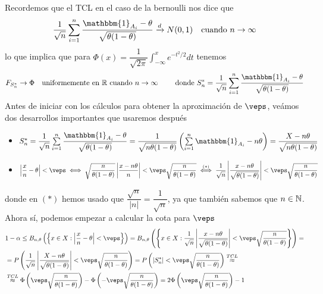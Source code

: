 \noindent
{} Recordemos que el TCL en el caso de la bernoulli nos dice que
\begin{equation*}
    \dfrac{1}{\sqrt{n}} \sum\limits_{i=1}^{n} \dfrac{\mathbbm{1}_{A_i} - \theta}{\sqrt{\theta(1-\theta)}} \xrightarrow{d} N(0,1) \quad \text{cuando } n \to \infty
\end{equation*}
lo que implica que para $\Phi(x)=\dfrac{1}{\sqrt{2\pi}} \int_{-\infty}^{x} e^{-t^2/2} dt$ tenemos
\begin{equation*}
    F_{S_n^*}\to \Phi \quad \text{uniformemente en } \R \text{ cuando }n \to \infty \qquad \text{ donde } S_n^* = \dfrac{1}{\sqrt{n}} \sum\limits_{i=1}^{n} \dfrac{\mathbbm{1}_{A_i} - \theta}{\sqrt{\theta(1-\theta)}}
\end{equation*}
Antes de iniciar con los cálculos para obtener la aproximación de $\veps$, veámos dos desarrollos importantes que usaremos después
\begin{itemize}
    \item  $S_n^*= \dfrac{1}{\sqrt{n}} \sum\limits_{i=1}^{n} \dfrac{\mathbbm{1}_{A_i} - \theta}{\sqrt{\theta(1-\theta)}} = \dfrac{1}{\sqrt{n \theta(1-\theta)}} \left(\sum\limits_{i=1}^{n} \mathbbm{1}_{A_i} - n \theta\right) = \dfrac{X - n \theta}{\sqrt{n \theta(1-\theta)}}$ 
    \item $\left| \dfrac{x}{n} - \theta \right| < \veps \iff \sqrt{\dfrac{n}{\theta(1-\theta)}} \left|\dfrac{x - n \theta}{n}\right| < \veps \sqrt{\dfrac{n}{\theta(1-\theta)}}  \overset{(*)}{\iff} \dfrac{1}{\sqrt{n}}\left| \dfrac{x-n\theta}{\sqrt{\theta(1-\theta)}} \right| < \veps \sqrt{\dfrac{n}{\theta(1-\theta)}}$
\end{itemize}
donde en $(*)$ hemos usado que $\dfrac{\sqrt{n}}{|n|} = \dfrac{1}{\sqrt{n}}$, ya que también sabemos que $n\in \mathbb{N}$. Ahora sí, podemos empezar a calcular la cota para $\veps$
\begin{align*}
    & 1-\alpha \leq B_{n,\theta}\left(\left\{x \in X : \left|\dfrac{x}{n} - \theta\right| < \veps\right\}\right) = B_{n,\theta}\left(\left\{x \in X : \dfrac{1}{\sqrt{n}}\left| \dfrac{x-n\theta}{\sqrt{\theta(1-\theta)}} \right| < \veps \sqrt{\dfrac{n}{\theta(1-\theta)}}\right\}\right)= \\
    & = P\left(\dfrac{1}{\sqrt{n}}\left| \dfrac{X-n\theta}{\sqrt{\theta(1-\theta)}} \right| < \veps \sqrt{\dfrac{n}{\theta(1-\theta)}}\right) = P\left(|S_n^*| < \veps \sqrt{\dfrac{n}{\theta(1-\theta)}}\right) \overset{TCL}{\approx} \\
    & \overset{TCL}{\approx}  \Phi\left( \veps \sqrt{\dfrac{n}{\theta(1-\theta)}}\right) - \Phi\left(- \veps \sqrt{\dfrac{n}{\theta(1-\theta)}}\right) = 2 \Phi\left( \veps \sqrt{\dfrac{n}{\theta(1-\theta)}}\right) - 1
\end{align*}
